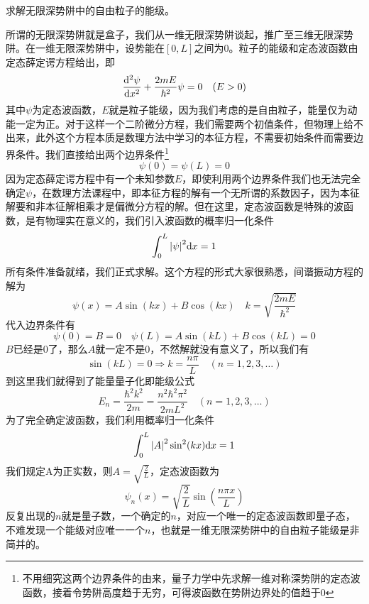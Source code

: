 \documentclass[../../main.tex]{subfiles}
\begin{document}
\begin{enumerate}
\begin{enumerate}
    \end{enumerate}
\end{enumerate}
\begin{example}
    求解无限深势阱中的自由粒子的能级。
    \begin{solution}
    所谓的无限深势阱就是盒子，我们从一维无限深势阱谈起，推广至三维无限深势阱。在一维无限深势阱中，设势能在\([0,L]\)之间为0。粒子的能级和定态波函数由定态薛定谔方程给出，即
    \begin{equation*}
        \dv[2]{\psi}{x}+\frac{2mE}{\hbar^2}\psi=0\quad (E>0)
    \end{equation*}
    其中\(\psi\)为定态波函数，\(E\)就是粒子能级，因为我们考虑的是自由粒子，能量仅为动能一定为正。对于这样一个二阶微分方程，我们需要两个初值条件，但物理上给不出来，此外这个方程本质是数理方法中学习的本征方程，不需要初始条件而需要边界条件。我们直接给出两个边界条件\footnote{不用细究这两个边界条件的由来，量子力学中先求解一维对称深势阱的定态波函数，接着令势阱高度趋于无穷，可得波函数在势阱边界处的值趋于0}
    \begin{equation*}
        \psi(0)=\psi(L)=0
    \end{equation*}
    因为定态薛定谔方程中有一个未知参数\(E\)，即使利用两个边界条件我们也无法完全确定\(\psi\)，在数理方法课程中，即本征方程的解有一个无所谓的系数因子，因为本征解要和非本征解相乘才是偏微分方程的解。但在这里，定态波函数是特殊的波函数，是有物理实在意义的，我们引入波函数的概率归一化条件
    \begin{equation*}
        \int_{0}^{L}\abs{\psi}^2\dd x=1
    \end{equation*}
    所有条件准备就绪，我们正式求解。这个方程的形式大家很熟悉，间谐振动方程的解为 
    \begin{equation*}
        \psi(x)=A\sin(kx)+B\cos(kx)\quad k=\sqrt{\frac{2mE}{\hbar^2}}
    \end{equation*}
    代入边界条件有
    \begin{equation*}
        \psi(0)=B=0\quad \psi(L)=A\sin(kL)+B\cos(kL)=0
    \end{equation*}
    \(B\)已经是0了，那么\(A\)就一定不是0，不然解就没有意义了，所以我们有
    \begin{equation*}
        \sin(kL)=0\Rightarrow k=\frac{n\pi}{L}\quad (n=1,2,3,\dots)
    \end{equation*}
    到这里我们就得到了能量量子化即能级公式
    \begin{equation*}
        E_n=\frac{\hbar^2k^2}{2m}=\frac{n^2\hbar^2\pi^2}{2mL^2}\quad (n=1,2,3,\dots)
    \end{equation*}
    为了完全确定波函数，我们利用概率归一化条件
    \begin{equation*}
        \int_{0}^{L}\abs{A}^2\sin[2](kx)\dd x=1
    \end{equation*}
    我们规定A为正实数，则\(A=\sqrt{\frac{2}{L}}\)，定态波函数为
    \begin{equation*}
        \psi_n(x)=\sqrt{\frac{2}{L}}\sin\left(\frac{n\pi x}{L}\right)
    \end{equation*}
    反复出现的\(n\)就是量子数，一个确定的\(n\)，对应一个唯一的定态波函数即量子态，不难发现一个能级对应唯一一个\(n\)，也就是一维无限深势阱中的自由粒子能级是非简并的。


\end{solution}
\end{example}
\end{document}
